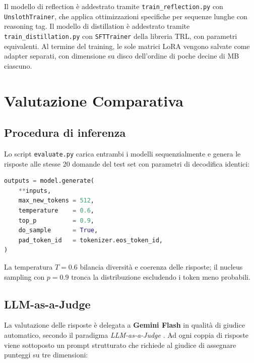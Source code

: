 Il modello di reflection è addestrato tramite \texttt{train\_reflection.py} con \\
\texttt{UnslothTrainer}, che applica ottimizzazioni specifiche per
sequenze lunghe con reasoning tag. Il modello di distillation è
addestrato tramite \texttt{train\_distillation.py} con
\texttt{SFTTrainer} della libreria TRL, con parametri equivalenti.
Al termine del training, le sole matrici LoRA vengono salvate come
adapter separati, con dimensione su disco dell'ordine di poche decine
di MB ciascuno.

\FloatBarrier
\section{Valutazione Comparativa}
\label{sec:step3}

\subsection{Procedura di inferenza}

Lo script \texttt{evaluate.py} carica entrambi i modelli sequenzialmente
e genera le risposte alle stesse 20 domande del test set con parametri
di decodifica identici:

\begin{lstlisting}[language=Python, caption={Parametri di generazione usati durante la valutazione.}, float=tbp]
outputs = model.generate(
    **inputs,
    max_new_tokens = 512,
    temperature    = 0.6,
    top_p          = 0.9,
    do_sample      = True,
    pad_token_id   = tokenizer.eos_token_id,
)
\end{lstlisting}

La temperatura $T = 0.6$ bilancia diversità e coerenza delle risposte;
il nucleus sampling con $p = 0.9$ tronca la distribuzione escludendo
i token meno probabili.

\subsection{LLM-as-a-Judge}

La valutazione delle risposte è delegata a \textbf{Gemini Flash}
in qualità di giudice automatico, secondo il paradigma
\emph{LLM-as-a-Judge} \cite{zheng2023judging}. Ad ogni coppia
di risposte viene sottoposto un prompt strutturato che richiede
al giudice di assegnare punteggi su tre dimensioni:


